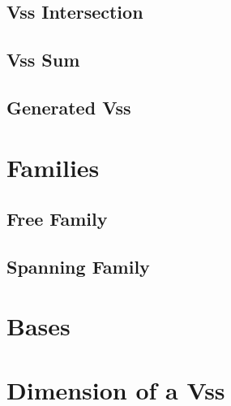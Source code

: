 \documentclass[notitlepage]{math}
\begin{document}
\subsection{Vss Intersection}
\subsection{Vss Sum}
\subsection{Generated Vss}
\section{Families}
\subsection{Free Family}
\subsection{Spanning Family}
\section{Bases}
\section{Dimension of a Vss}
\end{document}
